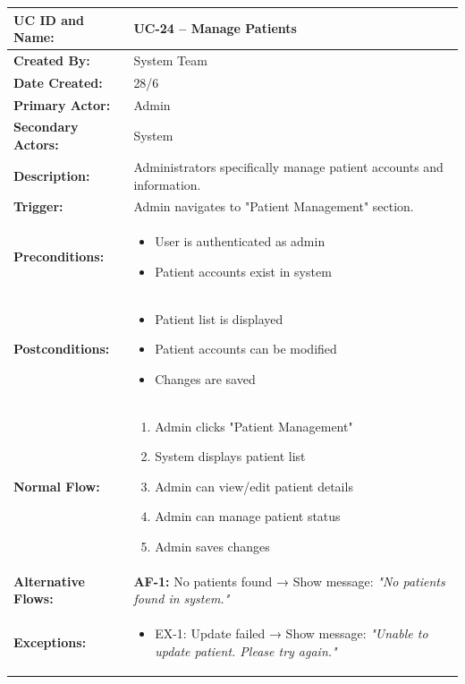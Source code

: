\documentclass[12pt,a4paper]{article}
\begin{document}
\renewcommand{\arraystretch}{1.5}
\begin{longtable}{|p{4.5cm}|p{10.5cm}|}
\hline
\textbf{UC ID and Name:} & UC-24 – Manage Patients \\
\hline
\textbf{Created By:} & System Team \\
\hline
\textbf{Date Created:} & 28/6 \\
\hline
\textbf{Primary Actor:} & Admin \\
\hline
\textbf{Secondary Actors:} & System \\
\hline
\textbf{Description:} & Administrators specifically manage patient accounts and information. \\
\hline
\textbf{Trigger:} & Admin navigates to "Patient Management" section. \\
\hline
\textbf{Preconditions:} &
\begin{itemize}
  \item User is authenticated as admin
  \item Patient accounts exist in system
\end{itemize} \\
\hline
\textbf{Postconditions:} &
\begin{itemize}
  \item Patient list is displayed
  \item Patient accounts can be modified
  \item Changes are saved
\end{itemize} \\
\hline
\textbf{Normal Flow:} &
\begin{enumerate}
  \item Admin clicks "Patient Management"
  \item System displays patient list
  \item Admin can view/edit patient details
  \item Admin can manage patient status
  \item Admin saves changes
\end{enumerate} \\
\hline
\textbf{Alternative Flows:} &
\textbf{AF-1:} No patients found → Show message: \textit{"No patients found in system."} \\
\hline
\textbf{Exceptions:} &
\begin{itemize}
  \item EX-1: Update failed → Show message: \textit{"Unable to update patient. Please try again."}
\end{itemize} \\

\end{longtable}
\end{document}
